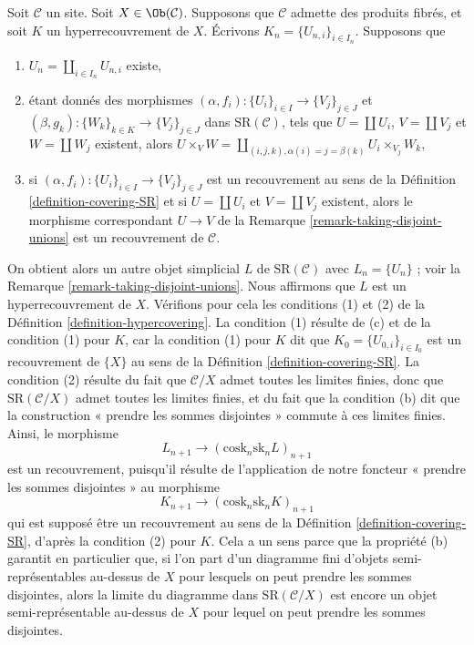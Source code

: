 \begin{remark}
\label{remark-take-unions-hypercovering-X}
Soit $\mathcal{C}$ un site. Soit $X \in \Ob(\mathcal{C})$.
Supposons que $\mathcal{C}$ admette des produits fibrés, et soit $K$ un hyperrecouvrement de $X$.
Écrivons $K_n = \{U_{n, i}\}_{i \in I_n}$. Supposons que
\begin{enumerate}
\item[(a)] $U_n = \coprod_{i \in I_n} U_{n, i}$ existe,
\item[(b)] étant donnés des morphismes
$(\alpha, f_i) : \{U_i\}_{i \in I} \to \{V_j\}_{j \in J}$ et
$(\beta, g_k) : \{W_k\}_{k \in K} \to \{V_j\}_{j \in J}$
dans $\text{SR}(\mathcal{C})$, tels que
$U = \coprod U_i$, $V = \coprod V_j$ et $W = \coprod W_j$
existent, alors $U \times_V W =
\coprod_{(i, j, k), \alpha(i) = j = \beta(k)} U_i \times_{V_j} W_k$,
\item[(c)] si $(\alpha, f_i) : \{U_i\}_{i \in I} \to \{V_j\}_{j \in J}$
est un recouvrement au sens de la
Définition \ref{definition-covering-SR}
et si $U = \coprod U_i$ et $V = \coprod V_j$ existent,
alors le morphisme correspondant $U \to V$
de la Remarque \ref{remark-taking-disjoint-unions}
est un recouvrement de $\mathcal{C}$.
\end{enumerate}
On obtient alors un autre objet simplicial $L$ de $\text{SR}(\mathcal{C})$
avec $L_n = \{U_n\}$ ; voir
la Remarque \ref{remark-taking-disjoint-unions}.
Nous affirmons que $L$ est un hyperrecouvrement de $X$.
Vérifions pour cela les conditions (1) et (2) de la
Définition \ref{definition-hypercovering}.
La condition (1) résulte de (c) et de la condition (1) pour $K$,
car la condition (1) pour $K$ dit que $K_0 = \{U_{0, i}\}_{i \in I_0}$
est un recouvrement de $\{X\}$ au sens de la
Définition \ref{definition-covering-SR}.
La condition (2) résulte du fait que $\mathcal{C}/X$ admet
toutes les limites finies, donc que $\text{SR}(\mathcal{C}/X)$
admet toutes les limites finies, et du fait que la condition (b) dit que la
construction « prendre les sommes disjointes » commute
à ces limites finies. Ainsi, le morphisme
$$
L_{n + 1} \longrightarrow (\text{cosk}_n \text{sk}_n L)_{n + 1}
$$
est un recouvrement, puisqu'il résulte de l'application de notre
foncteur « prendre les sommes disjointes » au morphisme
$$
K_{n + 1} \longrightarrow (\text{cosk}_n \text{sk}_n K)_{n + 1}
$$
qui est supposé être un recouvrement au sens de la
Définition \ref{definition-covering-SR}, d'après la condition (2) pour $K$.
Cela a un sens parce que la propriété (b) garantit en particulier
que, si l'on part d'un diagramme fini d'objets
semi-représentables au-dessus de $X$
pour lesquels on peut prendre les sommes disjointes, alors
la limite du diagramme dans $\text{SR}(\mathcal{C}/X)$
est encore un objet semi-représentable au-dessus de $X$ pour lequel
on peut prendre les sommes disjointes.
\end{remark}











